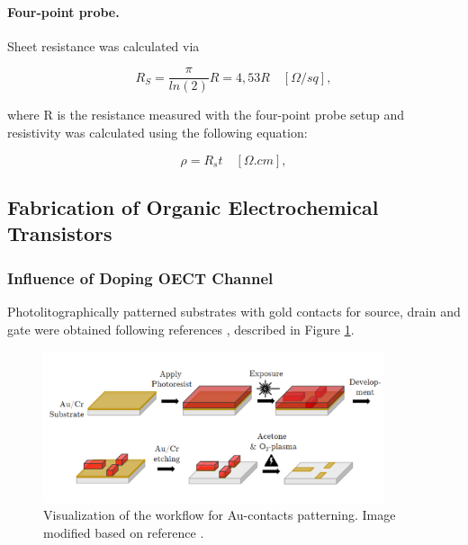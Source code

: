 \paragraph{Four-point probe.}Sheet resistance was calculated via

\begin{equation}\label{eq:rs}
	R_{S} = \frac{\pi}{ln(2)}R = 4,53 R \quad [\Omega/sq],
\end{equation}

where R is the resistance measured with the four-point probe setup and resistivity was calculated using the following equation:

\begin{equation}\label{eq:resist}
	\rho = R_{s}t \quad [\Omega.cm],
\end{equation}
 

\subsection{Fabrication of Organic Electrochemical Transistors}

\subsubsection{Influence of Doping OECT Channel} \label{subsec:photo}

Photolitographically patterned substrates with gold contacts for source, drain and gate were obtained following references \cite{weissbachPhotopatternableSolidElectrolyte2022}\cite{bongartzOrganicElectrochemicalTransistors2021}, described in Figure \ref{fig:aupat}.

\begin{figure}[ht]
	\centering
	\includegraphics[width=10cm]{Images/pdf/Au-patterning.pdf}
	\caption[Visualization of the workflow for Au-contacts patterning.]{Visualization of the workflow for Au-contacts patterning. Image modified based on reference \cite{bongartzOrganicElectrochemicalTransistors2021}.}
	\label{fig:aupat}
\end{figure}

